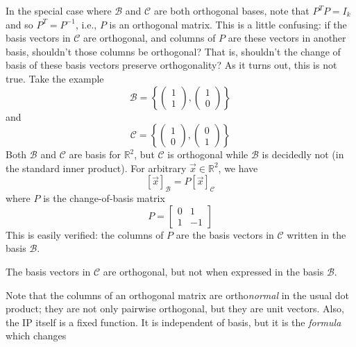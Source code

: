 In the special case where $\mathcal{B}$ and $\mathcal{C}$ are both orthogonal bases, note that $P^T P = I_k$ and so $P^T = P^{-1}$, i.e., $P$ is an orthogonal matrix. This is a little confusing: if the basis vectors in $\mathcal{C}$ are orthogonal, and columns of $P$ are these vectors in another basis, shouldn't those columns be orthogonal? That is, shouldn't the change of basis of these basis vectors preserve orthogonality? As it turns out, this is not true. Take the example
\[ \mathcal{B} = \left\{ \left( \begin{array}{c} 1\\ 1 \end{array} \right) , \left( \begin{array}{c} 1 \\ 0 \end{array}\right) \right\} \] and \[ \mathcal{C} = \left\{ \left( \begin{array}{c} 1 \\ 0 \end{array} \right), \left( \begin{array}{c} 0 \\ 1 \end{array} \right) \right\} \] Both $\mathcal{B}$ and $\mathcal{C}$ are basis for $\mathbb{R}^2$, but $\mathcal{C}$ is orthogonal while $\mathcal{B}$ is decidedly not (in the standard inner product). For arbitrary $\vec{x} \in \mathbb{R}^2$, we have \[ \left[ \vec{x} \right]_{\mathcal{B}} = P \left[ \vec{x} \right]_{\mathcal{C}} \] where $P$ is the change-of-basis matrix \[ P = \left[ \begin{array}{cc} 0 & 1 \\ 1 & -1 \end{array} \right] \] This is easily verified: the columns of $P$ are the basis vectors in $\mathcal{C}$ written in the basis $\mathcal{B}$.

The basis vectors in $\mathcal{C}$ are orthogonal, but not when expressed in the basis $\mathcal{B}$. 

Note that the columns of an orthogonal matrix are ortho\textit{normal} in the usual dot product; they are not only pairwise orthogonal, but they are unit vectors. Also, the IP itself is a fixed function. It is independent of basis, but it is the \textit{formula} which changes 



